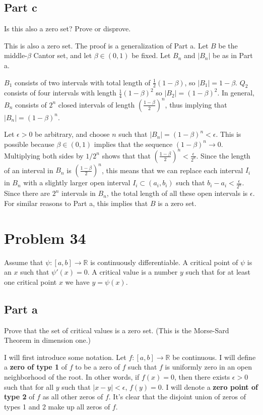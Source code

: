 \documentclass{article}
\newcommand{\R}{\mathbb{R}}
\begin{document}
\subsection*{Part c}

Is this also a zero set? Prove or disprove.

This is also a zero set. The proof is a generalization of Part a. Let $B$ be the middle-$\beta$ Cantor set, and let $\beta \in (0, 1)$ be fixed. Let $B_n$ and $|B_n|$ be as in Part a.

$B_1$ consists of two intervals with total length of $\frac{1}{2}(1-\beta)$, so $|B_1| = 1-\beta$. $Q_2$ consists of four intervals with length $\frac{1}{4}(1-\beta)^2$ so $|B_2| = (1-\beta)^2$. In general, $B_n$ consists of $2^n$ closed intervals of length $(\frac{1-\beta}{2})^n$, thus implying that $|B_n| = (1-\beta)^n$.

Let $\epsilon > 0$ be arbitrary, and choose $n$ such that $|B_n| = (1-\beta)^n < \epsilon$. This is possible because $\beta \in (0, 1)$ implies that the sequence $(1-\beta)^n \rightarrow 0$. Multiplying both sides by $1/2^n$ shows that that $(\frac{1-\beta}{2})^n < \frac{\epsilon}{2^n}$. Since the length of an interval in $B_n$ is $(\frac{1-\beta}{2})^n$, this means that we can replace each interval $I_i$ in $B_n$ with a slightly larger open interval $I_i \subset(a_i, b_i)$ such that $b_i - a_i < \frac{\epsilon}{2^n}$. Since there are $2^n$ intervals in $B_n$, the total length of all these open intervals is $\epsilon$. For similar reasons to Part a, this implies that $B$ is a zero set.

\section*{Problem 34}

Assume that $\psi: [a, b] \rightarrow \R$ is continuously differentiable. A critical point of $\psi$ is an $x$ such that $\psi'(x) = 0$. A critical value is a number $y$ such that for at least one critical point $x$ we have $y = \psi(x)$.

\subsection*{Part a}

Prove that the set of critical values is a zero set. (This is the Morse-Sard Theorem in dimension one.)

I will first introduce some notation. Let $f: [a, b] \rightarrow \R$ be continuous. I will define a \textbf{zero of type 1} of $f$ to be a zero of $f$ such that $f$ is uniformly zero in an open neighborhood of the root. In other words, if $f(x) = 0$, then there exists $\epsilon > 0$ such that for all $y$ such that $|x-y| < \epsilon$, $f(y) = 0$. I will denote a \textbf{zero point of type 2} of $f$ as all other zeros of $f$. It's clear that the disjoint union of zeros of types 1 and 2 make up all zeros of $f$.
\end{document}
